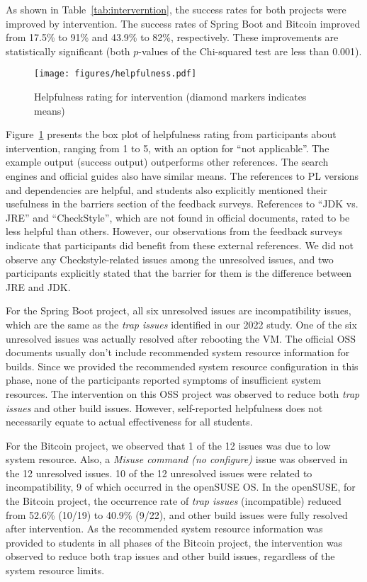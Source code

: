 \documentclass[10pt, conference]{IEEEtran}
\begin{document}
As shown in Table~\ref{tab:interverntion}, the success rates for both projects were improved by intervention. The success rates of Spring Boot and Bitcoin improved from 17.5\% to 91\% and 43.9\% to 82\%, respectively. These improvements are statistically significant (both $p$-values of the Chi-squared test are less than 0.001).

\begin{figure}[bp]
\vspace{-.6cm}
\centerline{
\texttt{[image: figures/helpfulness.pdf]}
}
\vspace{-.4cm}
\caption{Helpfulness rating for intervention (diamond markers indicates means)}

\label{fig:help}
\end{figure}

Figure~\ref{fig:help} presents the box plot of helpfulness rating from participants about intervention, ranging from 1 to 5, with an option for ``not applicable''. The example output (success output) outperforms other references. The search engines and official guides also have similar means. The references to PL versions and dependencies are helpful, and students also explicitly mentioned their usefulness in the barriers section of the feedback surveys. References to ``JDK vs. JRE'' and ``CheckStyle'', which are not found in official documents, rated to be less helpful than others. However, our observations from the feedback surveys indicate that participants did benefit from these external references. We did not observe any Checkstyle-related issues among the unresolved issues, and two participants explicitly stated that the barrier for them is the difference between JRE and JDK.

For the Spring Boot project, all six unresolved issues are incompatibility issues, which are the same as the \textit{trap issues} identified in our 2022 study. One of the six unresolved issues was actually resolved after rebooting the VM. The official OSS documents usually don’t include recommended system resource information for builds. Since we provided the recommended system resource configuration in this phase, none of the participants reported symptoms of insufficient system resources. The intervention on this OSS project was observed to reduce both \textit{trap issues} and other build issues. However, self-reported helpfulness does not necessarily equate to actual effectiveness for all students.

For the Bitcoin project, we observed that 1 of the 12 issues was due to low system resource. Also, a \textit{Misuse command (no configure)} issue was observed in the 12 unresolved issues. 10 of the 12 unresolved issues were related to incompatibility, 9 of which occurred in the openSUSE OS. In the openSUSE, for the Bitcoin project, the occurrence rate of \textit{trap issues} (incompatible) reduced from 52.6\% (10/19) to 40.9\% (9/22), and other build issues were fully resolved after intervention. As the recommended system resource information was provided to students in all phases of the Bitcoin project, the intervention was observed to reduce both trap issues and other build issues, regardless of the system resource limits.
\end{document}
